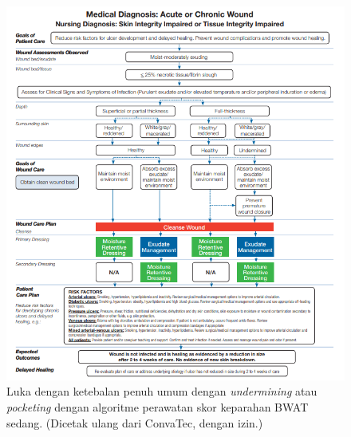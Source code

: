 \begin{figure}[H]
	\centering
	\includegraphics[keepaspectratio, width=14cm]{gambar/gambar_27}
	\caption{Luka dengan ketebalan penuh umum dengan \textit{undermining} atau \textit{pocketing} dengan algoritme perawatan skor keparahan BWAT sedang. (Dicetak ulang dari ConvaTec, dengan izin.) \citep{sussman2012}}
	\label{gambar:gambar_27}
\end{figure}

